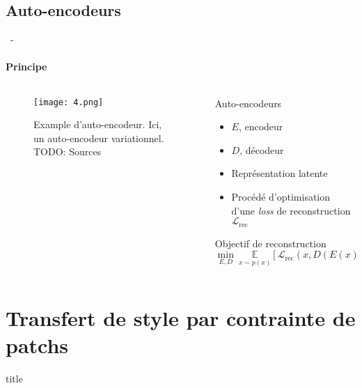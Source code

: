 \documentclass[aspectratio=169, 22pt]{beamer}
\begin{document}
\subsection{Auto-encodeurs}
\begin{frame}{\secname~- \subsecname}
  \framesubtitle{Principe}
  \begin{columns}
    \begin{column}{0.45\linewidth}

      \begin{figure}
        \centering
        \texttt{[image: 4.png]}
        \caption{Example d'auto-encodeur. Ici, un auto-encodeur variationnel. \alert{TODO: Sources}}
      \end{figure}
    \end{column}
    \begin{column}{0.55\linewidth}
      \begin{block}{Auto-encodeurs}
        \begin{itemize}
        \item $E$, encodeur
        \item $D$, décodeur
        \item Représentation \alert{latente}
        \item Procédé d'optimisation d'une \emph{loss} de reconstruction $\mathcal{L}_{\text{rec}}$
        \end{itemize}
      \end{block}

      \begin{block}{Objectif de reconstruction}
        \centering
        $\underset{E,D}{\min}\ \underset{x \sim p(x)}{\mathbb{E}}\left[\mathcal{L}_{\text{rec}}(x,D(E(x)))\right]$
      \end{block}
    \end{column}
  \end{columns}
\end{frame}

\section{Transfert de style par contrainte de patchs}
\begin{frame}
  \begin{beamercolorbox}[sep=15pt,center,shadow=true,rounded=true]{title}
    \LARGE\bfseries \secname
  \end{beamercolorbox}
\end{frame}
\end{document}
